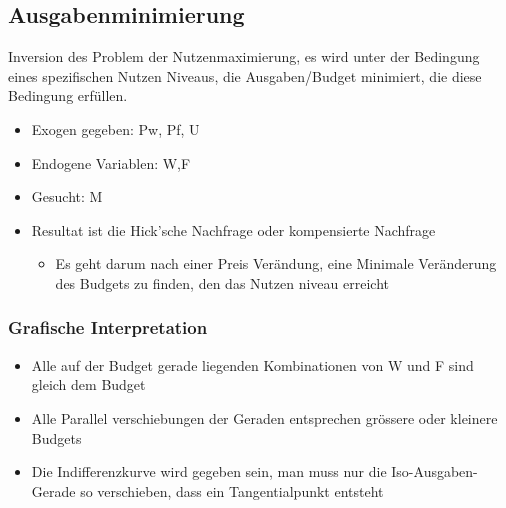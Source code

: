 \subsection{Ausgabenminimierung}
Inversion des Problem der Nutzenmaximierung, es wird unter der Bedingung eines spezifischen Nutzen Niveaus, die Ausgaben/Budget minimiert, die diese Bedingung erfüllen.
\begin{itemize}
    \item Exogen gegeben: Pw, Pf, U 
    \item Endogene Variablen: W,F
    \item Gesucht: M
    \item Resultat ist die Hick'sche Nachfrage oder kompensierte Nachfrage
    \begin{itemize}
        \item Es geht darum nach einer Preis Verändung, eine Minimale Veränderung des Budgets zu finden, den das Nutzen niveau erreicht
    \end{itemize}
\end{itemize}

\subsubsection{Grafische Interpretation}
\begin{itemize}
    \item Alle auf der Budget gerade liegenden Kombinationen von W und F sind gleich dem Budget
    \item Alle Parallel verschiebungen der Geraden entsprechen grössere oder kleinere Budgets
    \item Die Indifferenzkurve wird gegeben sein, man muss nur die Iso-Ausgaben-Gerade so verschieben, dass ein Tangentialpunkt entsteht
\end{itemize}


